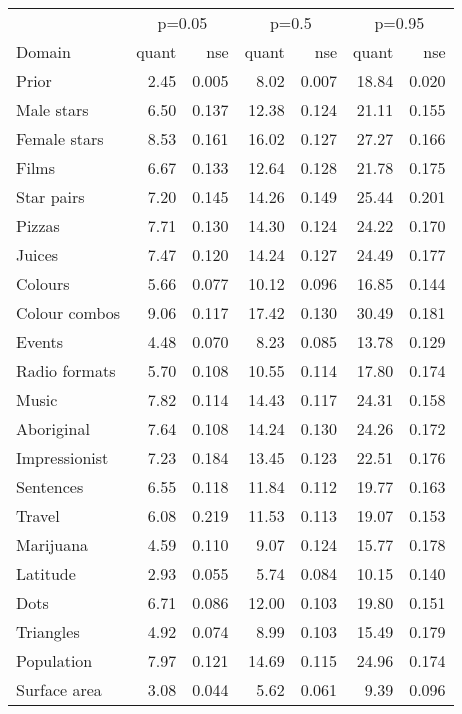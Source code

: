 
\begin{tabular}[t]{lrrrrrr}
\toprule
\multicolumn{1}{c}{ } & \multicolumn{2}{c}{p=0.05} & \multicolumn{2}{c}{p=0.5} & \multicolumn{2}{c}{p=0.95} \\
\cmidrule(l{3pt}r{3pt}){2-3} \cmidrule(l{3pt}r{3pt}){4-5} \cmidrule(l{3pt}r{3pt}){6-7}
Domain & quant & nse & quant & nse & quant & nse\\
\midrule
Prior & 2.45 & 0.005 & 8.02 & 0.007 & 18.84 & 0.020\\
Male stars & 6.50 & 0.137 & 12.38 & 0.124 & 21.11 & 0.155\\
Female stars & 8.53 & 0.161 & 16.02 & 0.127 & 27.27 & 0.166\\
Films & 6.67 & 0.133 & 12.64 & 0.128 & 21.78 & 0.175\\
Star pairs & 7.20 & 0.145 & 14.26 & 0.149 & 25.44 & 0.201\\
\addlinespace
Pizzas & 7.71 & 0.130 & 14.30 & 0.124 & 24.22 & 0.170\\
Juices & 7.47 & 0.120 & 14.24 & 0.127 & 24.49 & 0.177\\
Colours & 5.66 & 0.077 & 10.12 & 0.096 & 16.85 & 0.144\\
Colour combos & 9.06 & 0.117 & 17.42 & 0.130 & 30.49 & 0.181\\
Events & 4.48 & 0.070 & 8.23 & 0.085 & 13.78 & 0.129\\
\addlinespace
Radio formats & 5.70 & 0.108 & 10.55 & 0.114 & 17.80 & 0.174\\
Music & 7.82 & 0.114 & 14.43 & 0.117 & 24.31 & 0.158\\
Aboriginal & 7.64 & 0.108 & 14.24 & 0.130 & 24.26 & 0.172\\
Impressionist & 7.23 & 0.184 & 13.45 & 0.123 & 22.51 & 0.176\\
Sentences & 6.55 & 0.118 & 11.84 & 0.112 & 19.77 & 0.163\\
\addlinespace
Travel & 6.08 & 0.219 & 11.53 & 0.113 & 19.07 & 0.153\\
Marijuana & 4.59 & 0.110 & 9.07 & 0.124 & 15.77 & 0.178\\
Latitude & 2.93 & 0.055 & 5.74 & 0.084 & 10.15 & 0.140\\
Dots & 6.71 & 0.086 & 12.00 & 0.103 & 19.80 & 0.151\\
Triangles & 4.92 & 0.074 & 8.99 & 0.103 & 15.49 & 0.179\\
\addlinespace
Population & 7.97 & 0.121 & 14.69 & 0.115 & 24.96 & 0.174\\
Surface area & 3.08 & 0.044 & 5.62 & 0.061 & 9.39 & 0.096\\

\end{tabular}

